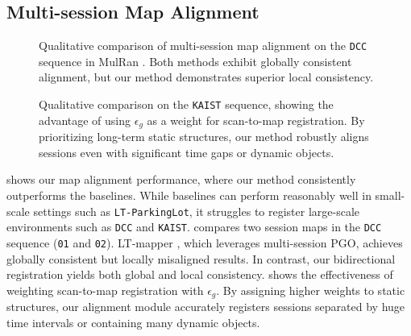 \subsection{Multi-session Map Alignment}



\begin{figure}[!t]
    \centering
    \caption{Qualitative comparison of multi-session map alignment on the \texttt{DCC} sequence in MulRan \cite{kim2020mulran}. Both methods exhibit globally consistent alignment, but our method demonstrates superior local consistency.}
    \label{fig:map_align}
    \vspace{-2mm}
\end{figure}

\begin{figure}[!t]
    \centering
    \caption{Qualitative comparison on the \texttt{KAIST} sequence, showing the advantage of using $\epsilon_g$ as a weight for scan-to-map registration. By prioritizing long-term static structures, our method robustly aligns sessions even with significant time gaps or dynamic objects.}
    \label{fig:icp_comparison}
    \vspace{-5mm}
\end{figure}

 shows our map alignment performance, where our method consistently outperforms the baselines. While baselines can perform reasonably well in small-scale settings such as \texttt{LT-ParkingLot}, it struggles to register large-scale environments such as \texttt{DCC} and \texttt{KAIST}.  
 compares two session maps in the \texttt{DCC} sequence (\texttt{01} and \texttt{02}). LT-mapper \cite{kim2022lt}, which leverages multi-session PGO, achieves globally consistent but locally misaligned results. In contrast, our bidirectional registration yields both global and local consistency.  
 shows the effectiveness of weighting scan-to-map registration with $\epsilon_g$. By assigning higher weights to static structures, our alignment module accurately registers sessions separated by huge time intervals or containing many dynamic objects.

